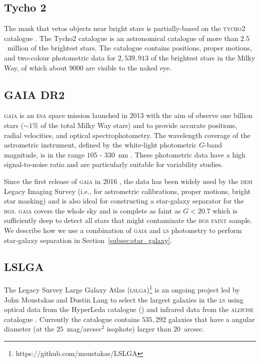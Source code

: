 \documentclass[fleqn,usenatbib]{mnras}
\newcommand{\ALLWISE}{\textsc{allwise}\xspace}
\newcommand{\BGSF}{\textsc{bgs faint}\xspace}
\newcommand{\BGS}{\textsc{bgs}\xspace}
\newcommand{\DESI}{\textsc{desi}\xspace}
\newcommand{\ESA}{\textsc{esa}\xspace}
\newcommand{\GAIA}{\textsc{gaia}\xspace}
\newcommand{\LS}{\textsc{ls}\xspace}
\newcommand{\LSLGA}{\textsc{lslga}\xspace}
\newcommand{\Tycho}{\textsc{tycho2}\xspace}
\begin{document}
\subsection{Tycho 2}

The mask that vetos objects near bright stars is partially-based on the \Tycho catalogue \citep{2000A&A...355L..27H}. The Tycho2 catalogue is an astronomical catalogue of more than $2.5$~million of the brightest stars. The catalogue contains positions, proper motions, and two-colour photometric data for $2,539,913$ of the brightest stars in the Milky Way, of which about $9000$ are visible to the naked eye.

\subsection{GAIA DR2}\label{subsec:gaia}

\GAIA \citep{2016A&A...595A...1G} is an \ESA space mission launched in 2013 with the aim of observe one billion stars ($\sim 1 \%$ of the total Milky Way stars) and to provide accurate positions, radial velocities, and optical spectrophotometry. The wavelength coverage of the astrometric instrument, defined by the white-light photometric $G$-band magnitude, is in the range $105$ - $330$~nm \citep{2016A&A...595A...7C}. These photometric data have a high signal-to-noise ratio and are particularly  suitable  for  variability  studies.

Since the first release of \GAIA in 2016 \citep{2016A&A...595A...2G}, the data
has been widely used by the \DESI Legacy Imaging Survey (i.e., for astrometric calibrations, proper motions, bright star masking) and is also ideal for constructing a star-galaxy separator for the \BGS. 
\GAIA covers the whole sky and is complete as faint as $G < 20.7$ which is sufficiently deep to detect all stars that might contaminate the \BGSF sample. We describe how we use a combination of \GAIA and \LS photometry to perform star-galaxy separation in Section~\ref{subsec:star_galaxy}.

\subsection{LSLGA}\label{subsec:LSLGA}

The Legacy Survey Large Galaxy Atlas (\LSLGA)\footnote{https://github.com/moustakas/LSLGA} is an ongoing project led by John Moustakas and Dustin Lang to select the largest galaxies in the \LS using optical data from the HyperLeda catalogue (\citet{2014A&A...570A..13M}) and infrared data from the \ALLWISE catalogue \citep{2015ApJS..221...12S}. Currently the catalogue contains $535,292$ galaxies that have a angular diameter (at the $25$~mag/arcsec$^2$ isophote) larger than $20$~arcsec.
\end{document}
